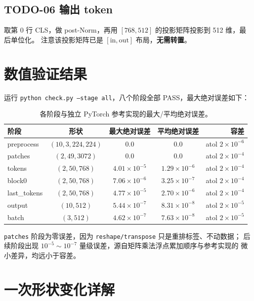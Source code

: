 \documentclass[11pt]{ctexart}
\begin{document}
\subsection{\textcolor{myred}{TODO-06} 输出 token}

取第 0 行 CLS，做 post-Norm，再用 $[768,512]$ 的投影矩阵投影到 512 维，最后单位化。
注意该投影矩阵已是 $[\mathrm{in},\mathrm{out}]$ 布局，\textbf{无需转置}。

\section{数值验证结果}

运行 \texttt{python check.py --stage all}，八个阶段全部 PASS，最大绝对误差如下：

\begin{table}[h]
\centering
\begin{tabular}{lcccr}
\toprule
阶段 & 形状 & 最大绝对误差 & 平均绝对误差 & 容差 \\
\midrule
preprocess & $(10,3,224,224)$ & $0.0$        & $0.0$        & atol $2\!\times\!10^{-6}$ \\
patches    & $(2,49,3072)$     & $0.0$        & $0.0$        & atol $2\!\times\!10^{-4}$ \\
tokens     & $(2,50,768)$      & $4.01\!\times\!10^{-5}$ & $1.29\!\times\!10^{-6}$ & atol $2\!\times\!10^{-4}$ \\
block0     & $(2,50,768)$      & $7.06\!\times\!10^{-6}$ & $3.25\!\times\!10^{-7}$ & atol $2\!\times\!10^{-4}$ \\
last\_tokens & $(2,50,768)$    & $4.77\!\times\!10^{-5}$ & $2.70\!\times\!10^{-6}$ & atol $2\!\times\!10^{-4}$ \\
output     & $(10,512)$        & $5.44\!\times\!10^{-7}$ & $8.31\!\times\!10^{-8}$ & atol $2\!\times\!10^{-5}$ \\
batch      & $(3,512)$         & $4.62\!\times\!10^{-7}$ & $7.63\!\times\!10^{-8}$ & atol $2\!\times\!10^{-5}$ \\
\bottomrule
\end{tabular}
\caption{各阶段与独立 PyTorch 参考实现的最大/平均绝对误差。}
\end{table}

\texttt{patches} 阶段为零误差，因为 \texttt{reshape/transpose} 只是重排标签、不动数据；
后续阶段出现 $10^{-5}\!\sim\!10^{-7}$ 量级误差，源自矩阵乘法浮点累加顺序与参考实现的
微小差异，均远小于容差。

\section{一次形状变化详解}
\end{document}
